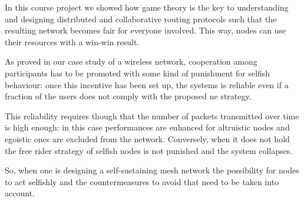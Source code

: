 \documentclass[conference,10.5pt]{IEEEtran}
\begin{document}
In this course project we showed how game theory is the key to understanding and designing distributed and collaborative routing protocols such that the resulting network becomes fair for everyone involved. This way, nodes can use their resources with a win-win result.

As proved in our case study of a wireless network, cooperation among participants has to be promoted with some kind of punishment for selfish behaviour: once this incentive has been set up, the systems is reliable even if a fraction of the users does not comply with the proposed \gls{ne} strategy.

This reliability requires though that the number of packets transmitted over time is high enough: in this case performances are enhanced for altruistic nodes and egoistic ones are excluded from the network.
Conversely, when it does not hold the free rider strategy of selfish nodes is not punished and the system collapses.

So, when one is designing a self-sustaining mesh network the possibility for nodes to act selfishly and the countermeasures to avoid that need to be taken into account.

\nocite{*}


\end{document}
